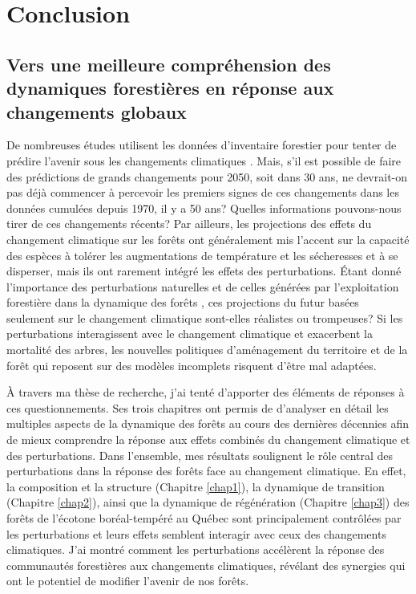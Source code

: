 \francais

\chapter*{Conclusion}

\setcounter{chapter}{4}

\hypertarget{vers-une-meilleure-compruxe9hension-des-dynamiques-forestiuxe8res-en-ruxe9ponse-aux-changements-globaux}{%
\section{Vers une meilleure compréhension des dynamiques forestières en
réponse aux changements
globaux}\label{vers-une-meilleure-compruxe9hension-des-dynamiques-forestiuxe8res-en-ruxe9ponse-aux-changements-globaux}}

De nombreuses études utilisent les données d'inventaire forestier pour
tenter de prédire l'avenir sous les changements climatiques
\citep{boulanger_climate_2017, chen_modeling_2002, iverson_estimating_2008, meier_climate_2012, perie_dominant_2016, vissault_biogeographie_2016}.
Mais, s'il est possible de faire des prédictions de grands changements
pour 2050, soit dans 30 ans, ne devrait-on pas déjà commencer à
percevoir les premiers signes de ces changements dans les données
cumulées depuis 1970, il y a 50 ans? Quelles informations pouvons-nous
tirer de ces changements récents? Par ailleurs, les projections des
effets du changement climatique sur les forêts ont généralement mis
l'accent sur la capacité des espèces à tolérer les augmentations de
température et les sécheresses et à se disperser, mais ils ont rarement
intégré les effets des perturbations. Étant donné l'importance des
perturbations naturelles et de celles générées par l'exploitation
forestière dans la dynamique des forêts \citep{turner_disturbance_2010},
ces projections du futur basées seulement sur le changement climatique
sont-elles réalistes ou trompeuses? Si les perturbations interagissent
avec le changement climatique et exacerbent la mortalité des arbres, les
nouvelles politiques d'aménagement du territoire et de la forêt qui
reposent sur des modèles incomplets risquent d'être mal adaptées.

À travers ma thèse de recherche, j'ai tenté d'apporter des éléments de
réponses à ces questionnements. Ses trois chapitres ont permis de
d'analyser en détail les multiples aspects de la dynamique des forêts au
cours des dernières décennies afin de mieux comprendre la réponse aux
effets combinés du changement climatique et des perturbations. Dans
l'ensemble, mes résultats soulignent le rôle central des perturbations
dans la réponse des forêts face au changement climatique. En effet, la
composition et la structure (Chapitre \ref{chap1}), la dynamique de
transition (Chapitre \ref{chap2}), ainsi que la dynamique de
régénération (Chapitre \ref{chap3}) des forêts de l'écotone
boréal-tempéré au Québec sont principalement contrôlées par les
perturbations et leurs effets semblent interagir avec ceux des
changements climatiques. J'ai montré comment les perturbations
accélèrent la réponse des communautés forestières aux changements
climatiques, révélant des synergies qui ont le potentiel de modifier
l'avenir de nos forêts.

